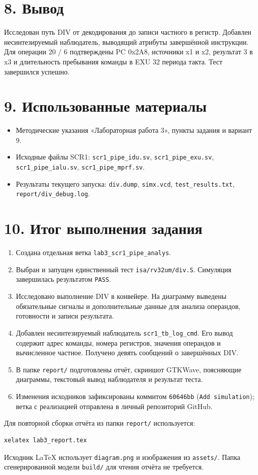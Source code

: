 \documentclass[
  russian,
]{article}
\providecommand{\tightlist}{%
  \setlength{\itemsep}{0pt}\setlength{\parskip}{0pt}}
\begin{document}
\section{8. Вывод}\label{ux432ux44bux432ux43eux434}

Исследован путь DIV от декодирования до записи частного в регистр.
Добавлен несинтезируемый наблюдатель, выводящий атрибуты завершённой
инструкции. Для операции 20 / 6 подтверждены PC 0x2A8, источники x1 и
x2, результат 3 в x3 и длительность пребывания команды в EXU 32 периода
такта. Тест завершился успешно.

\section{9. Использованные
материалы}\label{ux438ux441ux43fux43eux43bux44cux437ux43eux432ux430ux43dux43dux44bux435-ux43cux430ux442ux435ux440ux438ux430ux43bux44b}

\begin{itemize}
\tightlist
\item
  Методические указания «Лабораторная работа 3», пункты задания и
  вариант 9.
\item
  Исходные файлы SCR1: \texttt{scr1\_pipe\_idu.sv},
  \texttt{scr1\_pipe\_exu.sv}, \texttt{scr1\_pipe\_ialu.sv},
  \texttt{scr1\_pipe\_mprf.sv}.
\item
  Результаты текущего запуска: \texttt{div.dump}, \texttt{simx.vcd},
  \texttt{test\_results.txt}, \texttt{report/div\_debug.log}.
\end{itemize}


\section{10. Итог выполнения задания}

\begin{enumerate}
\item Создана отдельная ветка \texttt{lab3\_scr1\_pipe\_analys}.
\item Выбран и запущен единственный тест \texttt{isa/rv32um/div.S}.
Симуляция завершилась результатом \texttt{PASS}.
\item Исследовано выполнение DIV в конвейере. На диаграмму выведены
обязательные сигналы и дополнительные данные для анализа операндов,
готовности и записи результата.
\item Добавлен несинтезируемый наблюдатель \texttt{scr1\_tb\_log\_cmd}.
Его вывод содержит адрес команды, номера регистров, значения операндов
и вычисленное частное. Получено девять сообщений о завершённых DIV.
\item В папке \texttt{report/} подготовлены отчёт, скриншот GTKWave,
поясняющие диаграммы, текстовый вывод наблюдателя и результат теста.
\item Изменения исходников зафиксированы коммитом
\texttt{60646bb} (\texttt{Add simulation}); ветка с реализацией
отправлена в личный репозиторий GitHub.
\end{enumerate}

Для повторной сборки отчёта из папки \texttt{report/} используется:

\begin{verbatim}
xelatex lab3_report.tex
\end{verbatim}

Исходник LaTeX использует \texttt{diagram.png} и изображения
из \texttt{assets/}. Папка сгенерированной модели \texttt{build/}
для чтения отчёта не требуется.
\end{document}
